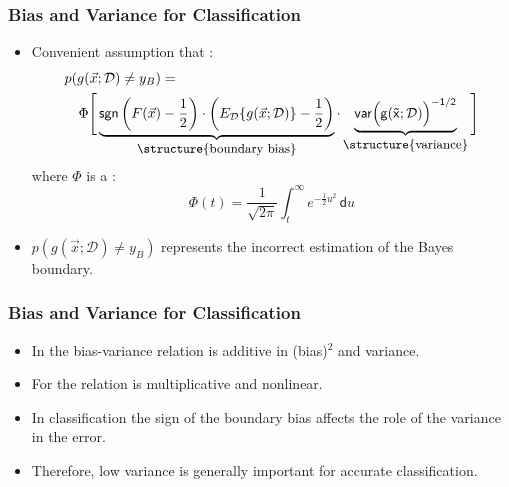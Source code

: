 \begin{frame}
  \frametitle{Bias and Variance for Classification \cont}

  \begin{itemize}
    \item Convenient assumption that :
      \begin{eqnarray*}
        \lefteqn{p(g(\vec x; {\mathcal{D}}) \neq y_B) =} \\
        & & \Phi \Bigg[ 
              \underbrace{\mathsf{sgn}\left(F(\vec x) - \frac{1}{2}\right) \cdot \left(E_{\mathcal{D}} \{ g(\vec x ; {\mathcal{D}}) \} - \frac{1}{2}\right) }_{\mbox{\small \structure{boundary bias}}}
              \cdot \underbrace{\mathsf{var\Big(g(\vec x ; {\mathcal{D}})\Big)^{-1/2}}}_{\mbox{\small \structure{variance}}} 
            \Bigg]
      \end{eqnarray*}
      where $\Phi$ is a : \\ \pause
      \begin{displaymath}
        \Phi(t) = \frac{1}{\sqrt{2\pi}} \int_t^\infty e^{-\frac{1}{2} u^2} \, \mathsf{d}u
      \end{displaymath}
    \item $p(g(\vec x; {\mathcal{D}}) \neq y_B)$ represents the incorrect estimation of the Bayes boundary.
  \end{itemize}
\end{frame}


\begin{frame}
  \frametitle{Bias and Variance for Classification \cont}


  \begin{itemize}
    \item In  the bias-variance relation is additive in (bias)$^2$ and variance. \pause
    \item For  the relation is multiplicative and nonlinear. \pause
    \item In classification the sign of the boundary bias affects the role of the variance in the error. \pause
    \item Therefore, low variance is generally important for accurate classification.
  \end{itemize}
  \pspread

\end{frame}


